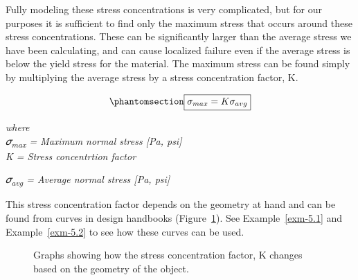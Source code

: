 \documentclass[
  letterpaper,
  DIV=11,
  numbers=noendperiod]{scrreprt}
\theoremstyle{definition}
\theoremstyle{remark}
\begin{document}
Fully modeling these stress concentrations is very complicated, but for
our purposes it is sufficient to find only the maximum stress that
occurs around these stress concentrations. These can be significantly
larger than the average stress we have been calculating, and can cause
localized failure even if the average stress is below the yield stress
for the material. The maximum stress can be found simply by multiplying
the average stress by a stress concentration factor, K.

\begin{equation}\phantomsection\label{eq-5.1}{
\boxed{\sigma_{max}=K \sigma_{avg}}
}\end{equation}

\emph{where}\\
\emph{𝜎\textsubscript{max} = Maximum normal stress {[}Pa, psi{]}}\\
\emph{K = Stress concentrtion factor}

\emph{𝜎\textsubscript{avg} = Average normal stress {[}Pa, psi{]}}

This stress concentration factor depends on the geometry at hand and can
be found from curves in design handbooks (Figure~\ref{fig-5.5}). See
Example~\ref{exm-5.1} and Example~\ref{exm-5.2} to see how these curves
can be used.

\begin{figure}


\caption{\label{fig-5.5}Graphs showing how the stress concentration
factor, K changes based on the geometry of the object.}

\end{figure}%
\end{document}

